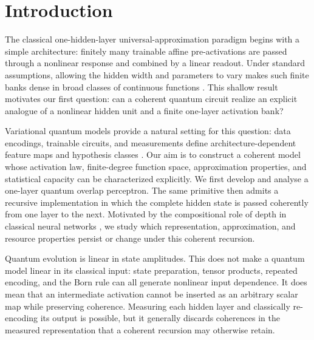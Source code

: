 \documentclass[pdflatex,sn-mathphys,NameDate,iicol]{sn-jnl}
\begin{document}

\maketitle

\section{Introduction}
\label{sec:introduction}

The classical one-hidden-layer universal-approximation paradigm begins with
a simple architecture: finitely many trainable affine pre-activations are
passed through a nonlinear response and combined by a linear readout. Under
standard assumptions, allowing the hidden width and parameters to vary makes
such finite banks dense in broad classes of continuous functions
\citep{cybenko1989approximation}. This shallow result motivates our first
question: can a coherent quantum circuit realize an explicit analogue of a
nonlinear hidden unit and a finite one-layer activation bank?

Variational quantum models provide a natural setting for this question:
data encodings, trainable circuits, and measurements define
architecture-dependent feature maps and hypothesis classes
\citep{schuld2019feature,abbas2021power}. Our aim is to construct a coherent
model whose activation law, finite-degree function space, approximation
properties, and statistical capacity can be characterized explicitly. We first
develop and analyse a one-layer quantum overlap perceptron. The same primitive
then admits a recursive implementation in which the complete hidden state is
passed coherently from one layer to the next. Motivated by the compositional
role of depth in classical neural networks
\citep{mhaskar2016deep,telgarsky2016benefits,
eldan2016power,daniely2017depth}, we study which representation,
approximation, and resource properties persist or change under this coherent
recursion.

Quantum evolution is linear in state amplitudes. This does not make a
quantum model linear in its classical input: state preparation, tensor
products, repeated encoding, and the Born rule can all generate nonlinear
input dependence. It does mean that an intermediate activation cannot be
inserted as an arbitrary scalar map while preserving coherence. Measuring
each hidden layer and classically re-encoding its output is possible, but it
generally discards coherences in the measured representation that a coherent
recursion may otherwise retain.
\end{document}
